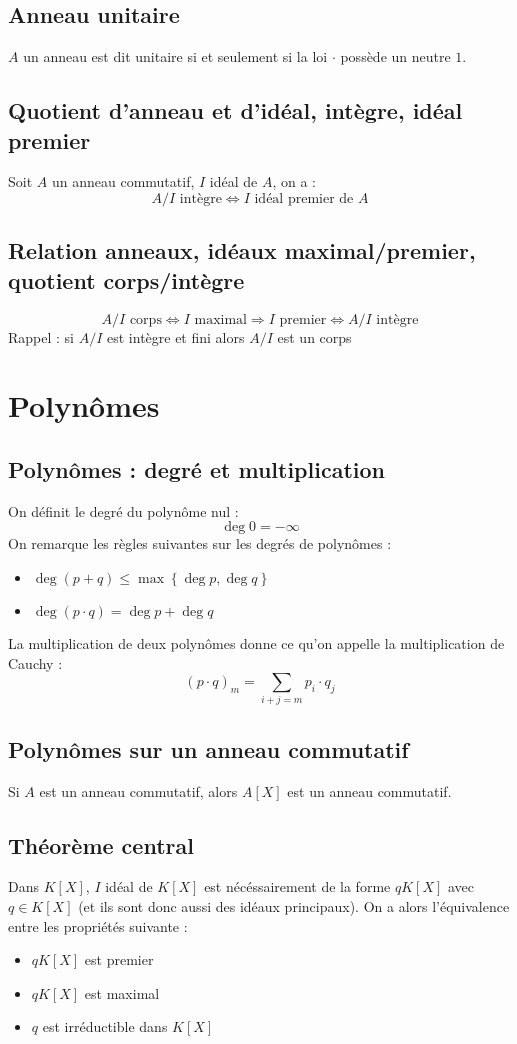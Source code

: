 \documentclass[a4paper,10pt]{article}
\newcommand{\set}[1]{\left\lbrace #1 \right\rbrace } %
\newcommand{\so}{\Rightarrow} %
\newcommand{\ioi}{\Leftrightarrow} %
\begin{document}
 \subsection{Anneau unitaire}
  $A$ un anneau est dit unitaire si et seulement si la loi $\cdot$ possède un neutre $1$.

  \subsection{Quotient d'anneau et d'idéal, intègre, idéal premier
  \label{qoaiiip}}
  Soit $A$ un anneau commutatif, $I$ idéal de $A$, on a :
   $$A/I \mbox{ intègre} \ioi I \mbox{ idéal premier de } A$$

 \subsection{Relation anneaux, idéaux maximal/premier, quotient corps/intègre}
   $$A/I \mbox{ corps} \ioi I \mbox{ maximal} 
   \so I \mbox{ premier} \ioi A/I \mbox{ intègre}$$
  Rappel : si $A/I$ est intègre et fini alors $A/I$ est un corps


\section{Polynômes}
 \subsection{Polynômes : degré et multiplication}
  On définit le degré du polynôme nul : 
   $$\deg 0 = -\infty$$
  On remarque les règles suivantes sur les degrés de polynômes :
   \begin{itemize}
    \item $\deg(p+q) \leq \max\set{\deg p, \deg q}$
    \item $\deg(p\cdot q) = \deg p + \deg q$
   \end{itemize}

  La multiplication de deux polynômes donne ce qu'on appelle la multiplication de Cauchy : 
  $$(p\cdot q)_m = \sum_{i+j=m} p_i \cdot q_j$$

 \subsection{Polynômes sur un anneau commutatif}
  Si $A$ est un anneau commutatif, alors $A[X]$ est un anneau commutatif.
 
 \subsection{Théorème central\label{thmcentral}}
  Dans $K[X]$, $I$ idéal de $K[X]$ est nécéssairement de la forme $qK[X]$
  avec $q \in K[X]$ (et ils sont donc aussi des idéaux principaux). On a alors
  l'équivalence entre les propriétés suivante :
  \begin{itemize}
   \item $qK[X]$ est premier
   \item $qK[X]$ est maximal
   \item $q$ est irréductible dans $K[X]$
  \end{itemize}
\end{document}
